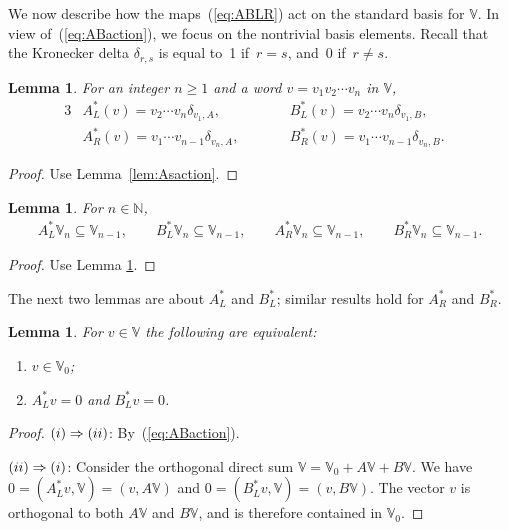 \documentclass[11pt]{article}
\numberwithin{equation}{section}
\numberwithin{equation}{section}
\newtheorem{Lemma}[Theorem]{Lemma}
\begin{document}
{We now describe how the maps~(\ref{eq:ABLR})
act on the standard basis for $\mathbb V$.
In view of~(\ref{eq:ABaction}),
we focus on the nontrivial basis elements.
Recall that the Kronecker delta $\delta_{r,s}$ is equal to~1 if~$r=s$, and~0 if~$r\not=s$.
\begin{Lemma}
\label{lem:Astar}
For an integer $n\geq 1$ and a word
$v=v_1v_2\cdots v_n$ in $\mathbb V$,
\begin{alignat*}{3}
& A^*_L(v) =v_2\cdots v_n \delta_{v_1, A},
\qquad && B^*_L(v) =v_2\cdots v_n \delta_{v_1, B},& \\
& A^*_R(v) =v_1\cdots v_{n-1} \delta_{v_n, A},\qquad &&
B^*_R(v) = v_1\cdots v_{n-1} \delta_{v_n, B}.&
\end{alignat*}
\end{Lemma}
\begin{proof} Use Lemma~\ref{lem:Asaction}.
\end{proof}
\begin{Lemma}\label{lem:ABsLower}
For $n \in \mathbb N$,
\begin{gather*}
A^*_L {\mathbb V}_n \subseteq {\mathbb V}_{n-1}, \qquad
B^*_L {\mathbb V}_n \subseteq {\mathbb V}_{n-1}, \qquad
A^*_R {\mathbb V}_n \subseteq {\mathbb V}_{n-1}, \qquad
B^*_R {\mathbb V}_n \subseteq {\mathbb V}_{n-1}.
\end{gather*}
\end{Lemma}
\begin{proof} Use Lemma
\ref{lem:Astar}.
\end{proof}

The next two lemmas are about $A^*_L$ and $B^*_L$; similar results
hold for $A^*_R$ and $B^*_R$.
\begin{Lemma}\label{lem:ABKer}
For $v \in \mathbb V$ the following are equivalent:
\begin{enumerate}\itemsep=0pt
\item[\rm (i)] $v \in {\mathbb V}_0$;
\item[\rm (ii)] $A^*_L v=0$ and $B^*_L v = 0$.
\end{enumerate}
\end{Lemma}
\begin{proof}${\rm (i)} \Rightarrow {\rm (ii)}$: By~(\ref{eq:ABaction}).

${\rm (ii)} \Rightarrow {\rm (i)}$: Consider the orthogonal
direct sum $\mathbb V= \mathbb V_0 + A\mathbb V + B \mathbb V$.
We have $0 = (A^*_Lv, \mathbb V) = (v, A\mathbb V)$ and
$0 = (B^*_Lv, \mathbb V) = (v, B\mathbb V)$.
The vector $v$ is orthogonal to both
$A\mathbb V$ and $B\mathbb V$, and is therefore contained in $\mathbb V_0$.
\end{proof}

}
\end{document}
